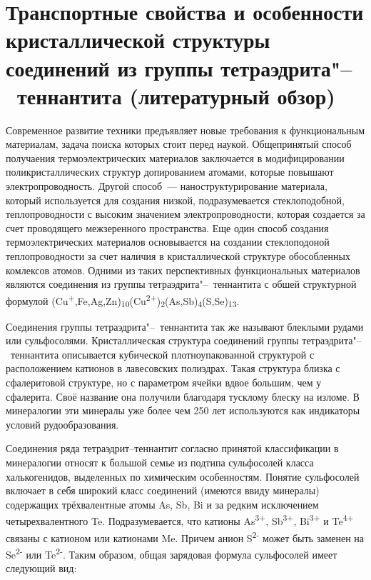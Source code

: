 \chapter{Транспортные свойства и особенности кристаллической структуры соединений из группы тетраэдрита"--~теннантита (литературный обзор)} \label{chapt1}

Современное развитие техники предъявляет новые требования к функциональным материалам, задача поиска которых стоит перед наукой. Общепринятый способ получаения термоэлектрических материалов заключается в модифицировании поликристаллических структур допированием атомами, которые повышают электропроводность. Другой способ~--- наноструктурирование материала, который используется для создания низкой, подразумевается стеклоподобной, теплопроводности с высоким значением электропроводности, которая создается за счет проводящего межзеренного пространства. Еще один способ создания термоэлектрических материалов основывается на создании стеклоподоной теплопроводности за счет наличия в кристаллической структуре обособленных комлексов атомов. Одними из таких перспективных функциональных материалов являются соединения из группы тетраэдрита"--~теннантита с обшей структурной формулой (Cu\textsuperscript{+},Fe,Ag,Zn)\textsubscript{10}(Cu\textsuperscript{2+})\textsubscript{2}(As,Sb)\textsubscript{4}(S,Se)\textsubscript{13}.

Соединения группы тетраэдрита"--~теннантита так же называют блеклыми рудами или сульфосолями. Кристаллическая структура соединений группы тетраэдрита"--~теннантита описывается кубической плотноупакованной структурой с расположением катионов в лавесовских полиэдрах. Такая структура близка с сфалеритовой структуре, но с параметром ячейки вдвое большим, чем у сфалерита. Своё название она  получили благодаря тусклому блеску на изломе. В минералогии эти минералы уже более чем 250 лет используются как индикаторы условий рудообразования.

Соединения ряда тетраэдрит--теннантит согласно принятой классификации в минералогии\cite{Molo2008} относят к большой семье из подтипа сульфосолей класса халькогенидов, выделенных по химическим особенностям.  
Понятие сульфосолей включает в себя широкий класс соединений (имеются ввиду минералы) содержащих трёхвалентные атомы As, Sb, Bi и за редким исключением четырехвалентного Te. 
Подразумевается, что катионы As\textsuperscript{3+}, Sb\textsuperscript{3+}, Bi\textsuperscript{3+} и Te\textsuperscript{4+} связаны с катионом или катионами Me. 
Причем анион  S\textsuperscript{2-} может быть заменен на Se\textsuperscript{2-} или Te\textsuperscript{2-}. Таким образом, общая зарядовая формула сульфосолей имеет следующий вид:

